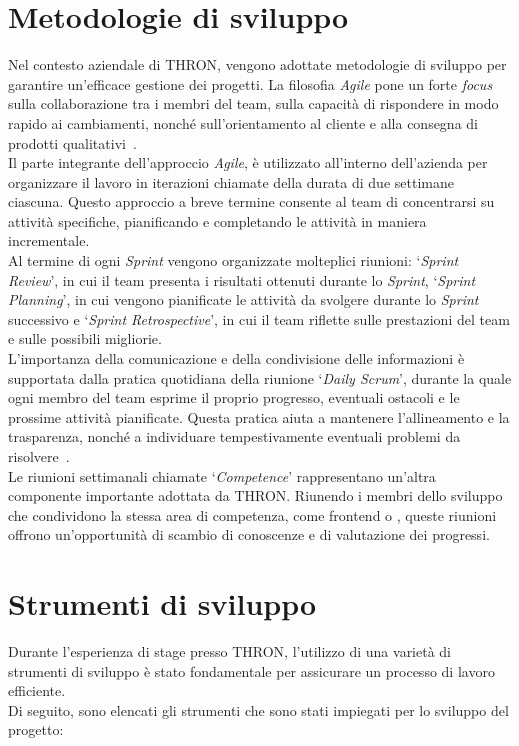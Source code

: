 \section{Metodologie di sviluppo}\label{sec:metodologie-sviluppo}
Nel contesto aziendale di THRON, vengono adottate metodologie di sviluppo  per garantire un'efficace
gestione dei progetti. La filosofia \textit{Agile} pone un forte \textit{focus} sulla collaborazione tra i membri del team,
sulla capacità di rispondere in modo rapido ai cambiamenti, nonché sull'orientamento al cliente e alla consegna di prodotti qualitativi~\cite{site:agile-manifesto}.\\
Il   parte integrante dell'approccio \textit{Agile}, è utilizzato all'interno dell'azienda per organizzare il lavoro in iterazioni chiamate
 della durata di due settimane ciascuna. Questo approccio a breve termine consente al team di concentrarsi su attività specifiche, pianificando
e completando le attività in maniera incrementale.\\
Al termine di ogni \textit{Sprint} vengono organizzate molteplici riunioni: `\textit{Sprint Review}', in cui il team presenta i risultati ottenuti durante lo \textit{Sprint},
`\textit{Sprint Planning}', in cui vengono pianificate le attività da svolgere durante lo \textit{Sprint} successivo e `\textit{Sprint Retrospective}', in cui il team riflette sulle prestazioni del team e sulle possibili migliorie.\\
L'importanza della comunicazione e della condivisione delle informazioni è supportata dalla pratica quotidiana della riunione `\textit{Daily Scrum}', durante la quale
ogni membro del team esprime il proprio progresso, eventuali ostacoli e le prossime attività pianificate. Questa pratica aiuta a mantenere l'allineamento e
la trasparenza, nonché a individuare tempestivamente eventuali problemi da risolvere~\cite{site:scrum}.\\
Le riunioni settimanali chiamate `\textit{Competence}' rappresentano un'altra componente importante adottata da THRON. Riunendo i membri dello sviluppo 
che condividono la stessa area di competenza, come frontend o , queste riunioni offrono un'opportunità di scambio di conoscenze e di valutazione dei progressi.
\section{Strumenti di sviluppo}\label{sec:strumenti-sviluppo}
Durante l'esperienza di stage presso THRON, l'utilizzo di una varietà di strumenti di sviluppo è stato fondamentale per assicurare un processo di lavoro efficiente.\\
Di seguito, sono elencati gli strumenti che sono stati impiegati per lo sviluppo del progetto:

